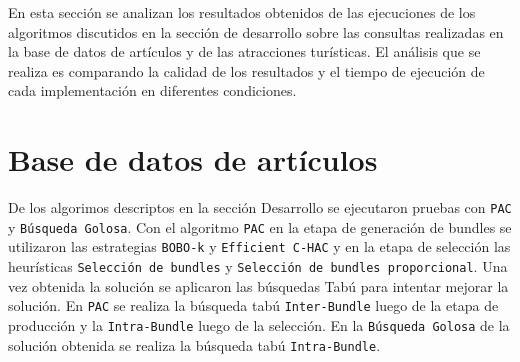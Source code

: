 En esta sección se analizan los resultados obtenidos de las ejecuciones de los algoritmos discutidos en la sección de desarrollo sobre las consultas realizadas en la base de datos de artículos y de las atracciones turísticas. El análisis que se realiza es comparando la calidad de los resultados y el tiempo de ejecución de cada implementación en diferentes condiciones.

\section{Base de datos de artículos}
De los algorimos descriptos en la sección Desarrollo se ejecutaron pruebas con \texttt{PAC} y \texttt{Búsqueda Golosa}. Con el algoritmo \texttt{PAC} en la etapa de generación de bundles se utilizaron las estrategias \texttt{BOBO-k} y \texttt{Efficient C-HAC} y en la etapa de selección las heurísticas \texttt{Selección de bundles} y \texttt{Selección de bundles proporcional}. Una vez obtenida la solución se aplicaron las búsquedas Tabú para intentar mejorar la solución. En \texttt{PAC} se realiza la búsqueda tabú \texttt{Inter-Bundle} luego de la etapa de producción y la \texttt{Intra-Bundle} luego de la selección. En la \texttt{Búsqueda Golosa} de la solución obtenida se realiza la búsqueda tabú \texttt{Intra-Bundle}.\\

